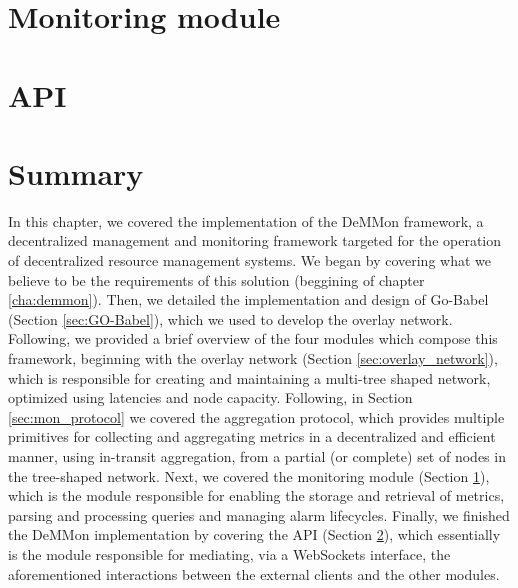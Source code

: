 \section{Monitoring module}
\label{sec:mon_module}


\section{API}
\label{sec:api}


\section{Summary}

In this chapter, we covered the implementation of the DeMMon framework, a decentralized management and monitoring framework targeted for the operation of decentralized resource management systems. We began by covering what we believe to be the requirements of this solution (beggining of chapter \ref{cha:demmon}). Then, we detailed the implementation and design of Go-Babel (Section \ref{sec:GO-Babel}), which we used to develop the overlay network. Following, we provided a brief overview of the four modules which compose this framework, beginning with the overlay network (Section \ref{sec:overlay_network}), which is responsible for creating and maintaining a multi-tree shaped network, optimized using latencies and node capacity. Following, in Section \ref{sec:mon_protocol} we covered the aggregation protocol, which provides multiple primitives for collecting and aggregating metrics in a decentralized and efficient manner, using in-transit aggregation, from a partial (or complete) set of nodes in the tree-shaped network. Next, we covered the monitoring module (Section \ref{sec:mon_module}), which is the module responsible for enabling the storage and retrieval of metrics, parsing and processing queries and managing alarm lifecycles. Finally, we finished the DeMMon implementation by covering the API (Section \ref{sec:api}), which essentially is the module responsible for mediating, via a WebSockets interface, the aforementioned interactions between the external clients and the other modules.